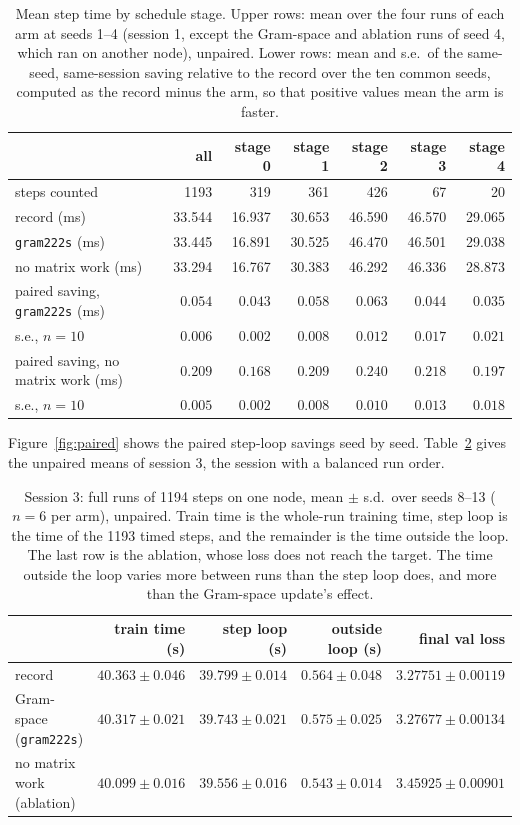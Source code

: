 \documentclass{article}
\begin{document}
\begin{table}[!htbp]\centering\small
\begin{tabular}{lrrrrrr}\toprule
 & all & stage 0 & stage 1 & stage 2 & stage 3 & stage 4\\\midrule
steps counted & 1193 & 319 & 361 & 426 & 67 & 20\\
record (ms) & 33.544 & 16.937 & 30.653 & 46.590 & 46.570 & 29.065\\
\texttt{gram222s} (ms) & 33.445 & 16.891 & 30.525 & 46.470 & 46.501 & 29.038\\
no matrix work (ms) & 33.294 & 16.767 & 30.383 & 46.292 & 46.336 & 28.873\\\midrule
paired saving, \texttt{gram222s} (ms) & $0.054$ & $0.043$ & $0.058$ & $0.063$ & $0.044$ & $0.035$\\
\quad s.e., $n=10$ & $0.006$ & $0.002$ & $0.008$ & $0.012$ & $0.017$ & $0.021$\\
paired saving, no matrix work (ms) & $0.209$ & $0.168$ & $0.209$ & $0.240$ & $0.218$ & $0.197$\\
\quad s.e., $n=10$ & $0.005$ & $0.002$ & $0.008$ & $0.010$ & $0.013$ & $0.018$\\\bottomrule
\end{tabular}
\caption{Mean step time by schedule stage. Upper rows: mean over the four runs of each arm at seeds 1--4 (session 1, except the Gram-space and ablation runs of seed 4, which ran on another node), unpaired. Lower rows: mean and s.e.\ of the same-seed, same-session saving relative to the record over the ten common seeds, computed as the record minus the arm, so that positive values mean the arm is faster.}\label{tab:stage}
\end{table}

Figure~\ref{fig:paired} shows the paired step-loop savings seed by seed. Table~\ref{tab:e2e} gives the unpaired means of session 3, the session with a balanced run order.

\begin{table}[!htbp]\centering\small
\begin{tabular}{lrrrr}\toprule
 & train time (s) & step loop (s) & outside loop (s) & final val loss\\\midrule
record & $40.363\pm0.046$ & $39.799\pm0.014$ & $0.564\pm0.048$ & $3.27751\pm0.00119$\\
Gram-space (\texttt{gram222s}) & $40.317\pm0.021$ & $39.743\pm0.021$ & $0.575\pm0.025$ & $3.27677\pm0.00134$\\
no matrix work (ablation) & $40.099\pm0.016$ & $39.556\pm0.016$ & $0.543\pm0.014$ & $3.45925\pm0.00901$\\\bottomrule
\end{tabular}
\caption{Session 3: full runs of 1194 steps on one node, mean $\pm$ s.d.\ over seeds 8--13 ($n=6$ per arm), unpaired. Train time is the whole-run training time, step loop is the time of the 1193 timed steps, and the remainder is the time outside the loop. The last row is the ablation, whose loss does not reach the target. The time outside the loop varies more between runs than the step loop does, and more than the Gram-space update's effect.}\label{tab:e2e}
\end{table}
\end{document}
